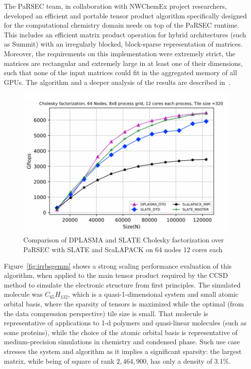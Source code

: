 %
%


The PaRSEC team, in collaboration with NWChemEx project researchers,
developed an efficient and portable tensor product algorithm
specifically designed for the computational chemistry domain needs on
top of the PaRSEC runtime. This includes an efficient matrix product
operation for hybrid architectures (such as Summit) with an irregularly
blocked, block-sparse representation of matrices. Moreover, the
requirements on this implementation were extremely strict, the
matrices are rectangular and extremely large in at least one of their
dimensions, such that none of the input matrices could fit in the
aggregated memory of all GPUs. The algorithm and a deeper analysis of
the results are described in~\cite{parsec::rr::irrbs}.

\begin{figure}
\vspace*{-1.5em}\centering\includegraphics[scale=0.50]{projects/2.3.1-PMR/2.3.1.09-ParSEC/slate_updated_nacl.pdf}
  \caption{Comparison of DPLASMA and SLATE Cholesky factorization over PaRSEC with
           SLATE and ScaLAPACK on 64 nodes 12 cores each\label{fig:slate-parsec}}
\end{figure}

Figure~\ref{fig:irrbsgemm} shows a strong scaling performance
evaluation of this algorithm, when applied to the main tensor product
required by the CCSD method to simulate the electronic structure from
first principles. The simulated molecule was $C_{65}H_{132}$, which is
a quasi-1-dimensional system and small atomic orbital basis, where the
sparsity of tensors is maximized while the optimal (from the data
compression perspective) tile size is small. That molecule is
representative of applications to 1-d polymers and quasi-linear
molecules (such as some proteins), while the choice of the atomic
orbital basis is representative of medium-precision simulations in
chemistry and condensed phase. Such use case stresses the system and
algorithm as it implies a significant sparsity: the largest matrix,
while being of square of rank $2,464,900$, has only a density of
3.1\%.

